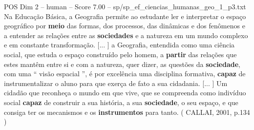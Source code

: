 \begin{textsample}{POS Dim 2 – human – Score 7.00 – sp/sp\_ef\_ciencias\_humanas\_geo\_1\_p3.txt}  \label{ex:f2_pos_010}
Na Educação Básica, a Geografia permite ao estudante ler e interpretar o espaço geográfico por \textbf{meio} das formas, dos processos, das dinâmicas e dos fenômenos e a entender as relações entre as \textbf{sociedades} e a natureza em um mundo complexo e em constante transformação. [... ] a Geografia, entendida como uma ciência social, que estuda o espaço construído pelo homem, a \textbf{partir} das relações que estes mantêm entre si e com a natureza, quer dizer, as questões da \textbf{sociedade}, com uma “ visão espacial ”, é por excelência uma disciplina formativa, \textbf{capaz} de instrumentalizar o aluno para que exerça de fato a sua cidadania. [... ] Um cidadão que reconheça o mundo em que vive, que se compreenda como indivíduo social \textbf{capaz} de construir a sua história, a sua \textbf{sociedade}, o seu espaço, e que consiga ter os mecanismos e os \textbf{instrumentos} para tanto. ( CALLAI, 2001, p.134 )

\end{textsample}

